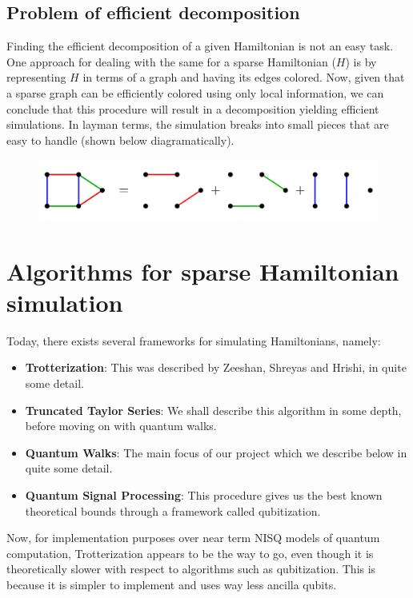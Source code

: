 \documentclass[
10pt, %
a4paper, %
oneside, %
headinclude,footinclude, %
BCOR5mm, %
]{scrartcl}
\begin{document}
\subsection{Problem of efficient decomposition}
Finding the efficient decomposition of a given Hamiltonian is not an easy task. One approach for dealing with the same for a sparse Hamiltonian ($H$) is by representing $H$ in terms of a graph and having its edges colored. Now, given that a sparse graph can be efficiently colored using only local information, we can conclude that this procedure will result in a decomposition yielding efficient simulations. In layman terms, the simulation breaks into small pieces that are easy to handle (shown below diagramatically).

\begin{figure}[H]
    \centering
    \includegraphics[width=\linewidth]{images/sparse_graph.png}
\end{figure}

\section{Algorithms for sparse Hamiltonian simulation}
Today, there exists several frameworks for simulating Hamiltonians, namely:
\begin{itemize}
    \item \textbf{Trotterization}: This was described by Zeeshan, Shreyas and Hrishi, in quite some detail.
    \item \textbf{Truncated Taylor Series}: We shall describe this algorithm in some depth, before moving on with quantum walks.
    \item \textbf{Quantum Walks}: The main focus of our project which we describe below in quite some detail. 
    \item \textbf{Quantum Signal Processing}: This procedure gives us the best known theoretical bounds through a framework called qubitization.
\end{itemize}

Now, for implementation purposes over near term NISQ models of quantum computation, Trotterization appears to be the way to go, even though it is theoretically slower with respect to algorithms such as qubitization. This is because it is simpler to implement and uses way less ancilla qubits.\newline
\end{document}
